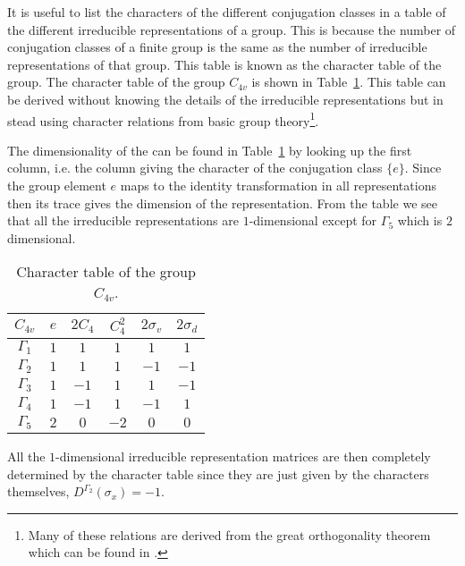 It is useful to list the characters of the different conjugation classes in a table of the different irreducible representations of a group.
This is because the number of conjugation classes of a finite group is the same as the number of irreducible representations of that group.
This table is known as the character table of the group. The character table of
the group $C_{4v}$ is shown in Table~\ref{tab:Group:Symm:characterTable}. This table can be derived without knowing the details of the irreducible
representations but in stead using character relations from basic group theory\footnote{Many of these relations are derived from the great orthogonality
theorem which can be found \eg in \cite{Inui90}.}. 

The dimensionality of the \irr can be found in Table~\ref{tab:Group:Symm:characterTable} by looking up the first column, i.e. the column giving
the character of the conjugation class $\{e\}$.
Since the group element $e$ maps to the identity transformation in all representations then its
trace gives the dimension of the representation. From the table we see that all the irreducible representations are $1$-dimensional except for
$\Gamma_5$ which is $2$ dimensional.
\begin{table}
    \centering
    \begin{tabular}{c|ccccc}
        $C_{4v}$ & $e$ & $2C_4$ & $C_4^2$ & $2\sigma_v$ & $2\sigma_d$\\ \hline
        $\Gamma_1$ & $1$ & $1$ & $1$ & $1$ & $1$\\
        $\Gamma_2$ & $1$ & $1$ & $1$ & $-1$ & $-1$\\
        $\Gamma_3$ & $1$ & $-1$ & $1$ & $1$ & $-1$\\
        $\Gamma_4$ & $1$ & $-1$ & $1$ & $-1$ & $1$\\
        $\Gamma_5$ & $2$ & $0$ & $-2$ & $0$ & $0$
    \end{tabular}
    \caption{Character table of the group $C_{4v}$.}
    \label{tab:Group:Symm:characterTable}
\end{table}
All the $1$-dimensional irreducible representation matrices are then completely determined by the character table since they are just given by
the characters themselves, \ie $D^{\Gamma_2}(\sigma_x) = -1$.

